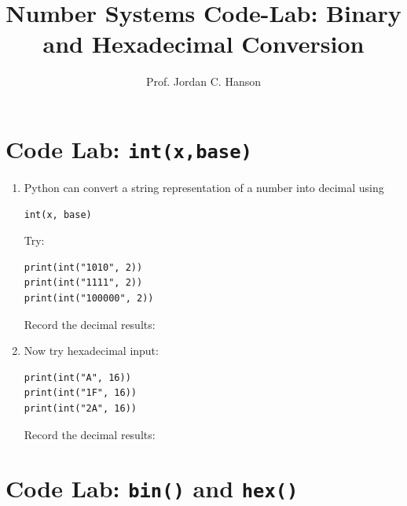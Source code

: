 \documentclass{article}
\begin{document}
\twocolumn

\title{Number Systems Code-Lab: Binary and Hexadecimal Conversion}
\author{Prof. Jordan C. Hanson}
\date{}

\maketitle

\section{Code Lab: \texttt{int(x,base)}}

\begin{enumerate}

\item Python can convert a string representation of a number into
decimal using

\begin{verbatim}
int(x, base)
\end{verbatim}

Try:

\begin{verbatim}
print(int("1010", 2))
print(int("1111", 2))
print(int("100000", 2))
\end{verbatim}

Record the decimal results: \\ \vspace{2cm}

\item Now try hexadecimal input:

\begin{verbatim}
print(int("A", 16))
print(int("1F", 16))
print(int("2A", 16))
\end{verbatim}

Record the decimal results: \\ \vspace{2cm}

\end{enumerate}


\section{Code Lab: \texttt{bin()} and \texttt{hex()}}
\end{document}
